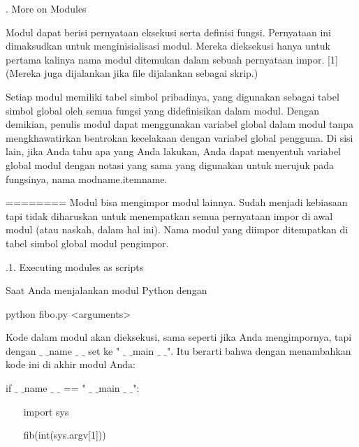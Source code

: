 \vspace{12pt}
. More on Modules \par
\noindent 
Modul dapat berisi pernyataan eksekusi serta definisi fungsi. Pernyataan ini dimaksudkan untuk menginisialisasi modul. Mereka dieksekusi hanya untuk pertama kalinya nama modul ditemukan dalam sebuah pernyataan impor. [1] (Mereka juga dijalankan jika file dijalankan sebagai skrip.) \par
\noindent 
Setiap modul memiliki tabel simbol pribadinya, yang digunakan sebagai tabel simbol global oleh semua fungsi yang didefinisikan dalam modul. Dengan demikian, penulis modul dapat menggunakan variabel global dalam modul tanpa mengkhawatirkan bentrokan kecelakaan dengan variabel global pengguna. Di sisi lain, jika Anda tahu apa yang Anda lakukan, Anda dapat menyentuh variabel global modul dengan notasi yang sama yang digunakan untuk merujuk pada fungsinya, nama modname.itemname. \par
========
\noindent 
Modul bisa mengimpor modul lainnya. Sudah menjadi kebiasaan tapi tidak diharuskan untuk menempatkan semua pernyataan impor di awal modul (atau naskah, dalam hal ini). Nama modul yang diimpor ditempatkan di tabel simbol global modul pengimpor. \par
\vspace{12pt}
\vspace{12pt}
\vspace{12pt}
\vspace{12pt}
\vspace{12pt}
\vspace{12pt}
.1. Executing modules as scripts \par
\noindent 
Saat Anda menjalankan modul Python dengan \par
\vspace{12pt}
\noindent 
python fibo.py <arguments> \par
\noindent 
Kode dalam modul akan dieksekusi, sama seperti jika Anda mengimpornya, tapi dengan  $  \_  $ $  \_  $name $  \_  $ $  \_  $ set ke " $  \_  $ $  \_  $main $  \_  $ $  \_  $". Itu berarti bahwa dengan menambahkan kode ini di akhir modul Anda: \par
\vspace{12pt}
\noindent 
if  $  \_  $ $  \_  $name $  \_  $ $  \_  $ == " $  \_  $ $  \_  $main $  \_  $ $  \_  $": \par
\noindent 
~~~ import sys \par
\noindent 
~~~ fib(int(sys.argv[1])) \par
